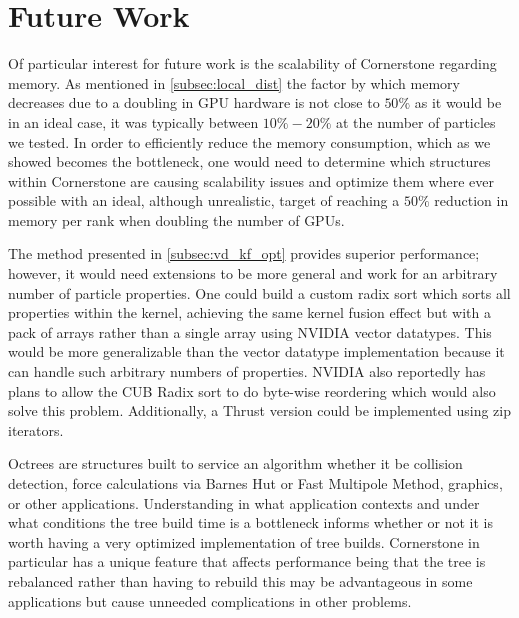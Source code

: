 \section{Future Work}
\label{sec:future}

Of particular interest for future work is the scalability of Cornerstone regarding memory. As mentioned in \ref{subsec:local_dist} the factor by which memory decreases due to a doubling in GPU hardware is not close to $50\%$ as it would be in an ideal case, it was typically between $10\% - 20\%$ at the number of particles we tested. In order to efficiently reduce the memory consumption, which as we showed becomes the bottleneck, one would need to determine which structures within Cornerstone are causing scalability issues and optimize them where ever possible with an ideal, although unrealistic, target of reaching a $50\%$ reduction in memory per rank when doubling the number of GPUs.

The method presented in \ref{subsec:vd_kf_opt} provides superior performance; however, it would need extensions to be more general and work for an arbitrary number of particle properties. One could build a custom radix sort which sorts all properties within the kernel, achieving the same kernel fusion effect but with a pack of arrays rather than a single array using NVIDIA vector datatypes. This would be more generalizable than the vector datatype implementation because it can handle such arbitrary numbers of properties. NVIDIA also reportedly has plans to allow the CUB Radix sort to do byte-wise reordering which would also solve this problem. Additionally, a Thrust version could be implemented using zip iterators.

Octrees are structures built to service an algorithm whether it be collision detection, force calculations via Barnes Hut or Fast Multipole Method, graphics, or other applications. Understanding in what application contexts and under what conditions the tree build time is a bottleneck informs whether or not it is worth having a very optimized implementation of tree builds. Cornerstone in particular has a unique feature that affects performance being that the tree is rebalanced rather than having to rebuild this may be advantageous in some applications but cause unneeded complications in other problems.
